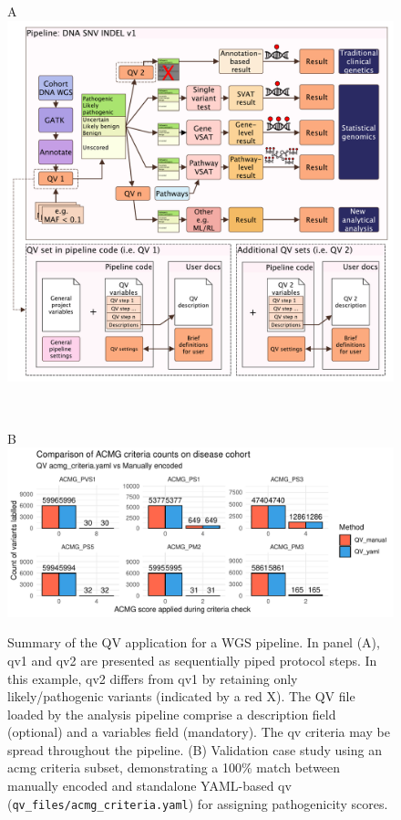 \begin{figure}[!h]
\centering
\begin{minipage}{0.85\textwidth}
\raggedright A\\[0.5ex]
\includegraphics[width=\textwidth]{./images/qv_pipeline_with_file_vcurrent.pdf}
\end{minipage}\\[-2ex]
\begin{minipage}{0.9\textwidth}
\raggedright B\\[0.5ex]
\includegraphics[width=\textwidth]{./images/Guru_singlecase_validation_of_yaml_vs_manual.pdf}
\end{minipage}
    \caption{Summary of the QV application for a WGS pipeline. In panel (A), \ac{qv}1 and \ac{qv}2 are presented as sequentially piped protocol steps. In this example, \ac{qv}2 differs from \ac{qv}1 by retaining only likely/pathogenic variants (indicated by a red X). The QV file loaded by the analysis pipeline comprise a description field (optional) and a variables field (mandatory). The \ac{qv} criteria may be spread throughout the pipeline.
    (B) Validation case study using an \ac{acmg} criteria subset, demonstrating a 100\% match between manually encoded and standalone YAML-based \ac{qv} (\texttt{qv\_files/acmg\_criteria.yaml}) for assigning pathogenicity scores.}
    \label{fig:qv_pipeline_with_file_vcurrent_guru_case_study_result}
\end{figure}


